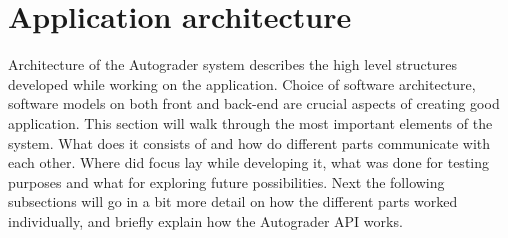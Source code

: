 


\section{Application architecture}
Architecture of the Autograder system describes the high level structures developed while working on the application. Choice of software architecture, software models on both front and back-end are crucial aspects of creating good application. This section will walk through the most important elements of the system. What does it consists of and how do different parts communicate with each other. Where did focus lay while developing it, what was done for testing purposes and what for exploring future possibilities. Next the following subsections will go in a bit more detail on how the different parts worked individually, and briefly explain how the Autograder API works.

